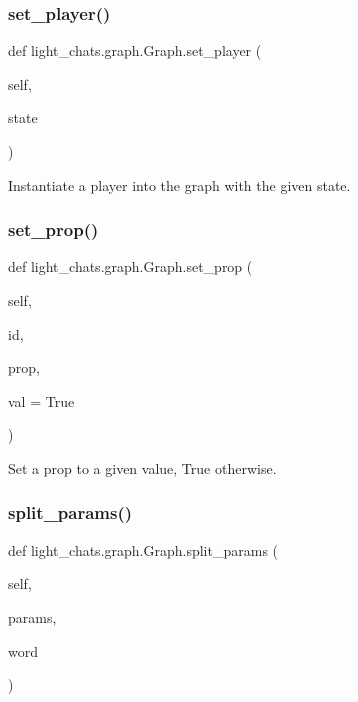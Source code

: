 \subsubsection{\texorpdfstring{set\+\_\+player()}{set\_player()}}
{\footnotesize\ttfamily def light\+\_\+chats.\+graph.\+Graph.\+set\+\_\+player (\begin{DoxyParamCaption}\item[{}]{self,  }\item[{}]{state }\end{DoxyParamCaption})}

\begin{DoxyVerb}Instantiate a player into the graph with the given state.
\end{DoxyVerb}
 \mbox{\label{classlight__chats_1_1graph_1_1Graph_ae2c69adb1ea1477aaa6d9af693b30fa1}} 
\subsubsection{\texorpdfstring{set\+\_\+prop()}{set\_prop()}}
{\footnotesize\ttfamily def light\+\_\+chats.\+graph.\+Graph.\+set\+\_\+prop (\begin{DoxyParamCaption}\item[{}]{self,  }\item[{}]{id,  }\item[{}]{prop,  }\item[{}]{val = {\ttfamily True} }\end{DoxyParamCaption})}

\begin{DoxyVerb}Set a prop to a given value, True otherwise.
\end{DoxyVerb}
 \mbox{\label{classlight__chats_1_1graph_1_1Graph_a3d44dae0701925da960433cb98229c21}} 
\subsubsection{\texorpdfstring{split\+\_\+params()}{split\_params()}}
{\footnotesize\ttfamily def light\+\_\+chats.\+graph.\+Graph.\+split\+\_\+params (\begin{DoxyParamCaption}\item[{}]{self,  }\item[{}]{params,  }\item[{}]{word }\end{DoxyParamCaption})}

